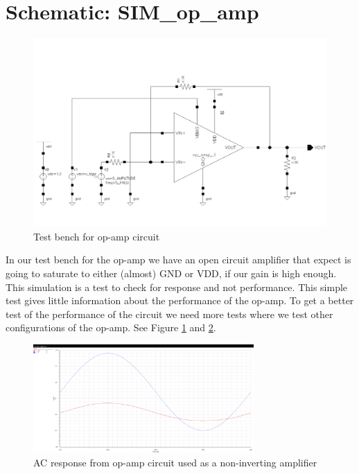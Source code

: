 \documentclass[english, a4paper,11pt]{article}
\begin{document}
\section*{Schematic: SIM\_op\_amp}
\begin{figure}[!ht]
 \centering
   \includegraphics[width=\textwidth]{img/SIM_op_amp_3.png}
   \caption{Test bench for op-amp circuit}
   \label{sim:opamp}
\end{figure}
In our test bench for the op-amp we have an open circuit amplifier that expect is going to saturate to either (almost) GND or VDD, if our gain is high enough.
This simulation is a test to check for response and not performance.
This simple test gives little information about the performance of the op-amp. 
To get a better test of the performance of the circuit we need more tests where we test other configurations of the op-amp. 
See Figure \ref{sim:opamp} and \ref{sim:opamp_ac_responce_and_bode_plot}.

\begin{figure}[!ht]
 \centering
   \includegraphics[width=0.75\textwidth]{img/ac_responce_and_bode_plot.png}
   \caption{AC response from op-amp circuit used as a non-inverting amplifier}
   \label{sim:opamp_ac_responce_and_bode_plot}
\end{figure}

\newpage
\printbibliography{}
\end{document}
